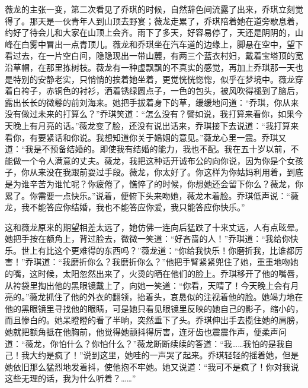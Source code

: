 \par 薇龙的主张一变，第二次看见了乔琪的时候，自然辞色间流露了出来，乔琪立刻觉得了。那天是一伙青年人到山顶去野宴；薇龙走累了，乔琪陪着她在道旁歇息着，约好了待会儿和大家在山顶上会齐。雨下了多天，好容易停了，天还是阴阴的，山峰在白雾中冒出一点青顶儿。薇龙和乔琪坐在汽车道的边缘上，脚悬在空中，望下看过去，在一片空白间，隐隐现出一带山麓，有两三个蓝衣村妇，戴着宝塔顶的宽沿草帽，在那里拣树枝。薇龙有一种虚飘飘的不真实的感觉，再加上乔琪那一天也是特别的安静老实，只悄悄的挨着她坐着，更觉恍恍惚惚，似乎在梦境中。薇龙穿着白袴子，赤铜色的衬衫，洒着锈绿圆点子，一色的包头，被风吹得褪到了脑后，露出长长的微鬈的前刘海来。她把手拔着身下的草，缓缓地问道：“乔琪，你从来没有做过未来的打算么？”乔琪笑道：“怎么没有？譬如说，我打算来看你，如果今天晚上有月亮的话。”薇龙变了脸，还没有说出话来，乔琪接下去说道：“我打算来看你，有要紧话和你说。我想知道你关于婚姻的意见。”薇龙心里一震。乔琪又道：“我是不预备结婚的。即使我有结婚的能力，我也不配。我在五十岁以前，不能做一个令人满意的丈夫。薇龙，我把这种话开诚布公的向你说，因为你是个女孩子，你从来没在我跟前耍过手段。薇龙，你太好了。你这样为你姑妈利用着，到底是为谁辛苦为谁忙呢？你疲倦了，憔悴了的时候，你想她还会留下你么？薇龙，你累了。你需要一点快乐。”说着，便俯下头来吻她，薇龙木着脸。乔琪低声说：“薇龙，我不能答应你结婚，我也不能答应你爱，我只能答应你快乐。”
\par 这和薇龙原来的期望相差太远了，她仿佛一连向后猛跌了十来丈远，人有点眩晕。她把手按在额角上，背过脸去，微微一笑道：“好吝啬的人！”乔琪道：“我给你快乐。世上有比这个更难得的东西吗？”薇龙道：“你给我快乐！你磨折我，比谁都厉害！”乔琪道：“我磨折你么？我磨折你么？”他把手臂紧紧兜住了她，重重地吻她的嘴，这时候，太阳忽然出来了，火烫的晒在他们的脸上。乔琪移开了他的嘴唇，从袴袋里掏出他的黑眼镜戴上了，向她一笑道：“你看，天晴了！今天晚上会有月亮的。”薇龙抓住了他的外衣的翻领，抬着头，哀恳似的注视着他的脸。她竭力地在他的黑眼镜里寻找他的眼睛，可是她只看见眼镜里反映的她自己的影子，缩小的，而且惨白的。她呆瞪瞪的看了半晌，突然垂下了头。乔琪伸出手去揽住她的肩膀，她就把额角抵在他胸前，他觉得她颤抖得厉害，连牙齿也震震作声，便柔声问道：“薇龙，你怕什么？你怕什么？”薇龙断断续续的答道：“我……我怕的是我自己！我大约是疯了！”说到这里，她哇的一声哭了起来。乔琪轻轻的摇着她，但是她依旧那么猛烈地发着抖，使他抱不牢她。她又说道：“我可不是疯了！你对我说这些无理的话，我为什么听着？……”
